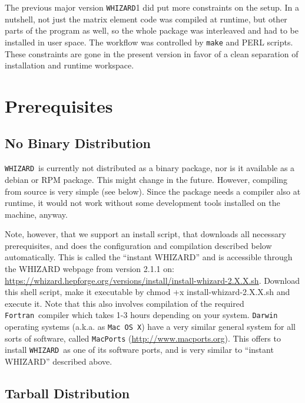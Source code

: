 \documentclass[12pt]{book}
\newenvironment{interaction}%
  {\begingroup\small
   \Verbatim}%
  {\endVerbatim
   \endgroup\noindent}
\newcommand{\ttt}[1]{\texttt{#1}}
\newcommand{\whizard}{\ttt{WHIZARD}}
\newcommand{\fortran}{\ttt{Fortran}}
\begin{document}
The previous major version \whizard1 did put more constraints on the
setup.  In a nutshell, not just the matrix element code was compiled
at runtime, but other parts of the program as well, so the whole
package was interleaved and had to be installed in user space.  The
workflow was controlled by \ttt{make} and PERL scripts.  These
constraints are gone in the present version in favor of a clean
separation of installation and runtime workspace.


\section{\label{sec:prerequisites}Prerequisites}

\subsection{No Binary Distribution}

\whizard\ is currently not distributed as a binary package, nor is it
available as a debian or RPM package.  This might change in the
future.  However, compiling from source is very simple (see below).
Since the package needs a compiler also at runtime, it would not work
without some development tools installed on the machine, anyway.

Note, however, that we support an install script, that downloads all
necessary prerequisites, and does the configuration and compilation
described below automatically. This is called the ``instant WHIZARD''
and is accessible through the WHIZARD webpage from version 2.1.1 on:
\url{https://whizard.hepforge.org/versions/install/install-whizard-2.X.X.sh}.
Download this shell script, make it executable by
\begin{interaction}
  chmod +x install-whizard-2.X.X.sh
\end{interaction}
and execute it. Note that this also involves compilation of the
required \fortran\ compiler which takes 1-3 hours depending on
your system.
\ttt{Darwin} operating systems (a.k.a. as \ttt{Mac OS X}) have a very
similar general system for all sorts of software, called
\ttt{MacPorts} (\url{http://www.macports.org}). This offers to install
\whizard\ as one of its software ports, and is very similar to
``instant WHIZARD'' described above.


\subsection{Tarball Distribution}
\label{sec:tarballdistr}
\end{document}
